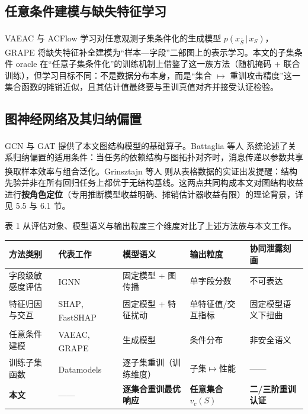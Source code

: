 \documentclass[10.5pt,compsoc,UTF8]{CjC}
\theoremstyle{mystyle}
\newcommand{\upcite}[1]{\textsuperscript{\cite{#1}}}
\begin{document}
\subsection{任意条件建模与缺失特征学习}

VAEAC\upcite{ivanov2019vaeac} 与 ACFlow\upcite{li2020acflow} 学习对任意观测子集条件化的生成模型 $p(x_{\bar S}\,|\,x_S)$，GRAPE\upcite{you2020grape} 将缺失特征补全建模为“样本—字段”二部图上的表示学习。本文的子集条件 oracle 在“任意子集条件化”的训练机制上借鉴了这一族方法（随机掩码 + 联合训练），但学习目标不同：不是数据分布本身，而是“集合 $\mapsto$ 重训攻击精度”这一集合函数的摊销近似，且其估计值最终要与重训真值对齐并接受认证检验。

\subsection{图神经网络及其归纳偏置}

GCN\upcite{kipf2017gcn} 与 GAT\upcite{velickovic2018gat} 提供了本文图结构模型的基础算子。Battaglia 等人\upcite{battaglia2018relational} 系统论述了关系归纳偏置的适用条件：当任务的依赖结构与图拓扑对齐时，消息传递以参数共享换取样本效率与组合泛化。Grinsztajn 等人\upcite{grinsztajn2022tabular} 则从表格数据的实证出发提醒：结构先验并非在所有回归任务上都优于无结构基线。这两点共同构成本文对图结构收益进行\textbf{按角色定位}（专用推断模型收益明确、摊销估计器收益有限）的理论背景，详见 5.5 与 6.1 节。

表 1 从评估对象、模型语义与输出粒度三个维度对比了上述方法族与本文工作。

\begin{table}[htbp]
\vspace {1mm}
\begin{center}
\begin{tabular}{lllll}
\toprule
方法类别 & 代表工作 & 模型语义 & 输出粒度 & 协同泄露刻画 \\
\midrule
字段级敏感度评估 & IGNN\upcite{hu2026ignn} & 固定模型 + 图传播 & 单字段分数 & 不可表达 \\
特征归因与交互 & SHAP\upcite{lundberg2017shap}, FastSHAP\upcite{jethani2022fastshap} & 固定模型 + 特征扰动 & 单特征值/交互指标 & 固定模型语义下扭曲 \\
任意条件建模 & VAEAC\upcite{ivanov2019vaeac}, GRAPE\upcite{you2020grape} & 生成模型 & 条件分布 & 非安全语义 \\
训练子集函数 & Datamodels\upcite{ilyas2022datamodels} & 逐子集重训（训练维度） & 子集$\mapsto$性能 & —— \\
\textbf{本文} & —— & \textbf{逐集合重训最优响应} & \textbf{任意集合 $v_c(S)$} & \textbf{二/三阶重训认证} \\
\bottomrule
\end{tabular}
\label{tab:related}
\end{center}
\end{table}
\end{document}
